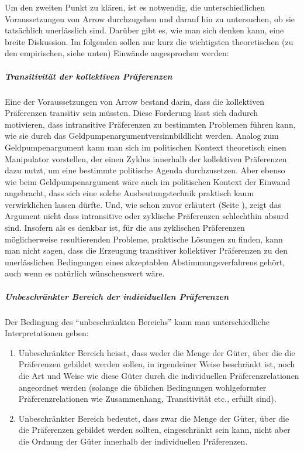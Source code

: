 Um den zweiten Punkt zu klären, ist es notwendig, die unterschiedlichen
Voraussetzungen von Arrow durchzugehen und darauf hin zu untersuchen, ob sie
tatsächlich unerlässlich sind. Darüber gibt es, wie man sich denken kann, eine
breite Diskussion. Im folgenden sollen nur kurz die wichtigsten theoretischen
(zu den empirischen, siehe unten) Einwände angesprochen werden:

\subparagraph{Transitivität der kollektiven Präferenzen}

Eine der Voraussetzungen von Arrow bestand darin, dass die kollektiven
Präferenzen transitiv sein müssten. Diese Forderung lässt sich dadurch motivieren, dass
intransitive Präferenzen zu bestimmten Problemen führen kann, wie sie durch das
Geldpumpenargumentversinnbildlicht werden. Analog zum Geldpumpenargument kann man
sich im politischen Kontext theoretisch einen Manipulator vorstellen, der einen
Zyklus innerhalb der kollektiven Präferenzen dazu nutzt, um eine bestimmte
politische Agenda durchzusetzen. Aber ebenso wie beim Geldpumpenargument wäre
auch im politischen Kontext der Einwand angebracht, dass sich eine solche
Ausbeutungstechnik praktisch kaum verwirklichen lassen dürfte. Und, wie schon
zuvor erläutert (Seite \pageref{Geldpumpenargument}), zeigt das Argument nicht
dass intransitive oder zyklische Präferenzen schlechthin absurd sind. 
Insofern als es denkbar ist, für die aus zyklischen Präferenzen möglicherweise
resultierenden Probleme, praktische Lösungen zu finden, kann man nicht sagen,
dass die Erzeugung transitiver kollektiver Präferenzen zu den unerlässlichen
Bedingungen eines akzeptablen Abstimmungsverfahrens gehört, auch wenn es
natürlich wünschenswert wäre.

\subparagraph{Unbeschränkter Bereich der individuellen Präferenzen}
\label{DiskussionUnbeschraenkterBereich}
Der Bedingung des "`unbeschränkten Bereichs"' kann man unterschiedliche
Interpretationen geben:

\begin{enumerate}
  \item Unbeschränkter Bereich heisst, dass weder die Menge der Güter, über die
  die Präferenzen gebildet werden sollen, in irgendeiner Weise beschränkt ist,
  noch die Art und Weise wie diese Güter durch die
  individuellen Präferenzrelationen angeordnet werden (solange die üblichen
  Bedingungen wohlgeformter Präferenzrelationen wie Zusammenhang, Transitivität
  etc., erfüllt sind).
  \item Unbeschränkter Bereich bedeutet, dass zwar die Menge der Güter, über
  die die Präferenzen gebildet werden sollten, eingeschränkt sein kann, nicht
  aber die Ordnung der Güter innerhalb der individuellen Präferenzen.
\end{enumerate}

